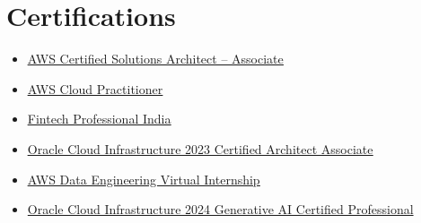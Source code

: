 \documentclass[a4paper,11pt]{article}
\newcommand{\resumeItem}[1]{
  \item\small{#1}
}
\newcommand{\resumeItemListStart}{\begin{itemize}[rightmargin=0.11in]}
\newcommand{\resumeItemListEnd}{\end{itemize}}
\begin{document}
\section{Certifications}
\resumeItemListStart
  \resumeItem{\href{https://www.linkedin.com/posts/siva-sekhar-kondudru_aws-certified-solutions-architect-associate-activity-7301969106331652096-APdg?utm_source=share&utm_medium=member_desktop&rcm=ACoAAEXHoGkBRv19sSSrvygDLucTRumeBdVS7N0}{\uline{AWS Certified Solutions Architect – Associate}}}
  \resumeItem{\href{https://www.linkedin.com/posts/siva-sekhar-kondudru_aws-certified-cloud-practitioner-activity-7301968396944912384-UN7P?utm_source=share&utm_medium=member_desktop&rcm=ACoAAEXHoGkBRv19sSSrvygDLucTRumeBdVS7N0}{\uline{AWS Cloud Practitioner}}}
  \resumeItem{\href{https://www.linkedin.com/posts/siva-sekhar-kondudru_fintechcertified-finance-techinnovation-activity-7301969361462824960-7s_v?utm_source=share&utm_medium=member_desktop&rcm=ACoAAEXHoGkBRv19sSSrvygDLucTRumeBdVS7N0}{\uline{Fintech Professional India}}}
  \resumeItem{\href{https://www.linkedin.com/posts/siva-sekhar-kondudru_oracle-certification-activity-7229883725252022274-ihwM?utm_source=share&utm_medium=member_desktop&rcm=ACoAAEXHoGkBRv19sSSrvygDLucTRumeBdVS7N0}{\uline{Oracle Cloud Infrastructure 2023 Certified Architect Associate}}}
  \resumeItem{\href{https://www.linkedin.com/posts/siva-sekhar-kondudru_aicte-certificate-activity-7205616902826557440-sxfe?utm_source=share&utm_medium=member_desktop}{\uline{AWS Data Engineering Virtual Internship}}}
  \resumeItem{\uline{Oracle Cloud Infrastructure 2024 Generative AI Certified Professional}}
\resumeItemListEnd{}

\end{document}

